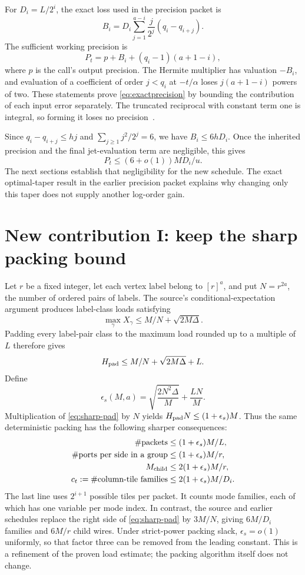 \documentclass[11pt,letterpaper]{article}
\theoremstyle{definition}\newtheorem{definition}[theorem]{Definition}
\theoremstyle{remark}\newtheorem{remark}[theorem]{Remark}
\begin{document}
For $D_i=L/2^i$, the exact loss used in the precision packet is
\[
 B_i=D_i\sum_{j=1}^{a-i}\frac{j}{2^j}(q_i-q_{i+j}).
\]
The sufficient working precision is
\begin{equation}\label{eq:exactprecision}
 P_t=p+B_i+(q_i-1)(a+1-i),
\end{equation}
where $p$ is the call's output precision. The Hermite multiplier has
valuation $-B_i$, and evaluation of a coefficient of order $j<q_i$
at $-t/\alpha$ loses $j(a+1-i)$ powers of two. These statements prove
\eqref{eq:exactprecision} by bounding the contribution of each input error
separately. The truncated reciprocal with constant term one is integral,
so forming it loses no precision~\cite{precisionpacket}.

Since $q_i-q_{i+j}\le hj$ and
$\sum_{j\ge1}j^2/2^j=6$, we have $B_i\le6hD_i$. Once the inherited
precision and the final jet-evaluation term are negligible, this gives
\begin{equation}\label{eq:precisionsix}
 P_t\le(6+o(1))MD_i/u.
\end{equation}
The next sections establish that negligibility for the new schedule.
The exact optimal-taper result in the earlier precision packet explains
why changing only this taper does not supply another log-order gain.

\section{New contribution I: keep the sharp packing bound}\label{sec:packing}
Let $r$ be a fixed integer, let each vertex label belong to $[r]^a$, and
put $N=r^{2a}$, the number of ordered pairs of labels. The source's
conditional-expectation argument produces label-class loads satisfying
\[
 \max_\gamma X_\gamma\le M/N+\sqrt{2M\Delta}.
\]
Padding every label-pair class to the maximum load rounded up to a multiple
of $L$ therefore gives
\begin{equation}\label{eq:sharp-pad}
 H_{\rm pad}\le M/N+\sqrt{2M\Delta}+L.
\end{equation}
Define
\[
 \epsilon_s(M,a)=\sqrt{\frac{2N^2\Delta}{M}}+\frac{LN}{M}.
\]
Multiplication of \eqref{eq:sharp-pad} by $N$ yields
$H_{\rm pad}N\le(1+\epsilon_s)M$. Thus the same deterministic
packing has the following sharper consequences:
\begin{align}
 \#\text{packets}&\le(1+\epsilon_s)M/L,\label{eq:packetsharp}\\
 \#\text{ports per side in a group}&\le(1+\epsilon_s)M/r,\\
 M_{\rm child}&\le2(1+\epsilon_s)M/r,\label{eq:childsharp}\\
 c_t:=\#\text{column-tile families}&\le2(1+\epsilon_s)M/D_i.
 \label{eq:colsharp}
\end{align}
The last line uses $2^{i+1}$ possible tiles per packet. It counts mode
families, each of which has one variable per mode index. In contrast,
the source and earlier schedules replace the right side of
\eqref{eq:sharp-pad} by $3M/N$, giving $6M/D_i$ families and
$6M/r$ child wires. Under strict-power packing slack,
$\epsilon_s=o(1)$ uniformly, so that factor three can be removed from
the leading constant. This is a refinement of the proven load estimate;
the packing algorithm itself does not change.
\end{document}
